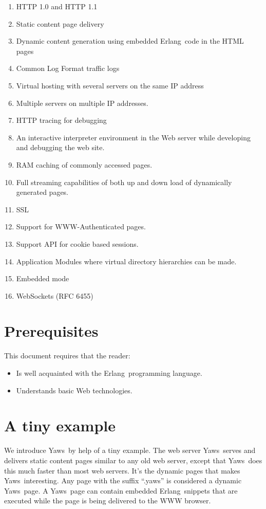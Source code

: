 \documentclass[11pt,oneside,english]{book}
\newcommand{\Erlang}            %
        {{\sc Erlang}}
\newcommand{\Yaws}            %
        {{\sc Yaws}}
\begin{document}
\begin{enumerate}
\item HTTP 1.0 and HTTP 1.1
\item Static content page delivery
\item Dynamic content generation using embedded \Erlang\  code in the
HTML pages
\item Common Log Format traffic logs
\item Virtual hosting with several servers on the same IP address
\item Multiple servers on multiple IP addresses.
\item HTTP tracing for debugging
\item An interactive interpreter environment in the Web server while
developing and debugging the web site.
\item RAM caching of commonly accessed pages.
\item Full streaming capabilities of both up and down load of dynamically
generated pages.
\item SSL
\item Support for WWW-Authenticated pages.
\item Support API for cookie based sessions.
\item Application Modules where virtual directory hierarchies can
be made.
\item Embedded mode
\item WebSockets (RFC 6455)
\end{enumerate}

\section{Prerequisites}
This document requires that the reader:
\begin{itemize}
\item Is well acquainted with the \Erlang\  programming language.
\item Understands basic Web technologies.
\end{itemize}


\section{A tiny example}

We introduce \Yaws\  by help of a tiny example.
 The web server \Yaws\  serves  and delivers
static content pages similar to any old web server, except that \Yaws\  does this
much faster than most web servers. It's the dynamic pages
that makes \Yaws\  interesting. Any page with the suffix ``.yaws'' is considered
a dynamic \Yaws\  page. A \Yaws\  page can contain embedded \Erlang\  snippets that
are executed while the page is being delivered to the WWW browser.
\end{document}
